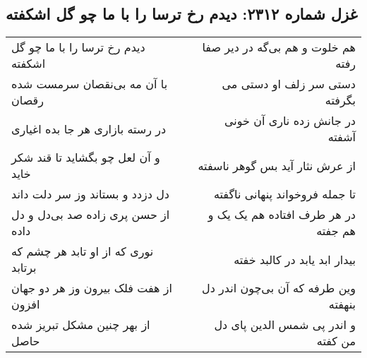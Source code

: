 \begin{center}
\section*{غزل شماره ۲۳۱۲: دیدم رخ ترسا را با ما چو گل اشکفته}
\label{sec:2312}
\begin{longtable}{l p{0.5cm} r}
دیدم رخ ترسا را با ما چو گل اشکفته
&&
هم خلوت و هم بی‌گه در دیر صفا رفته
\\
با آن مه بی‌نقصان سرمست شده رقصان
&&
دستی سر زلف او دستی می بگرفته
\\
در رسته بازاری هر جا بده اغیاری
&&
در جانش زده ناری آن خونی آشفته
\\
و آن لعل چو بگشاید تا قند شکر خاید
&&
از عرش نثار آید بس گوهر ناسفته
\\
دل دزدد و بستاند وز سر دلت داند
&&
تا جمله فروخواند پنهانی ناگفته
\\
از حسن پری زاده صد بی‌دل و دل داده
&&
در هر طرف افتاده هم یک یک و هم جفته
\\
نوری که از او تابد هر چشم که برتابد
&&
بیدار ابد یابد در کالبد خفته
\\
از هفت فلک بیرون وز هر دو جهان افزون
&&
وین طرفه که آن بی‌چون اندر دل بنهفته
\\
از بهر چنین مشکل تبریز شده حاصل
&&
و اندر پی شمس الدین پای دل من کفته
\\
\end{longtable}
\end{center}
